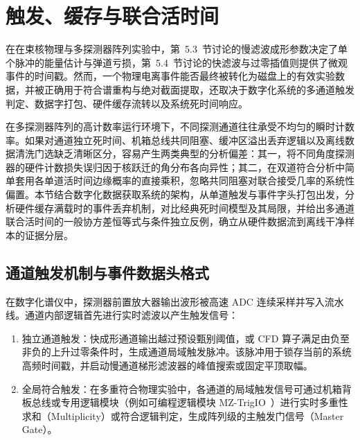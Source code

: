 \section{触发、缓存与联合活时间}\label{sec:5-5}

在在束核物理与多探测器阵列实验中，第~5.3~节讨论的慢滤波成形参数决定了单个脉冲的能量估计与弹道亏损，第~5.4~节讨论的快滤波与过零插值则提供了微观事件的时间戳。然而，一个物理电离事件能否最终被转化为磁盘上的有效实验数据，并被正确用于符合谱重构与绝对截面提取，还取决于数字化系统的多通道触发判定、数据字打包、硬件缓存流转以及系统死时间响应。

在多探测器阵列的高计数率运行环境下，不同探测通道往往承受不均匀的瞬时计数率。如果对通道独立死时间、机箱总线共同阻塞、缓冲区溢出丢弃逻辑以及离线数据清洗门选缺乏清晰区分，容易产生两类典型的分析偏差：其一，将不同角度探测器的硬件计数损失误归因于核跃迁的角分布各向异性；其二，在双道符合分析中简单套用各单道活时间边缘概率的直接乘积，忽略共同阻塞对联合接受几率的系统性偏置。本节结合数字化数据获取系统的架构，从单道触发与事件字头打包出发，分析硬件缓存满载时的事件丢弃机制，对比经典死时间模型及其局限，并给出多通道联合活时间的一般协方差恒等式与条件独立反例，确立从硬件数据流到离线干净样本的证据分层。

\subsection{通道触发机制与事件数据头格式}\label{subsec:5-5-1}

在数字化谱仪中，探测器前置放大器输出波形被高速 ADC 连续采样并写入流水线。通道内部逻辑首先进行实时滤波以产生触发信号：
\begin{enumerate}
\item 独立通道触发：快成形通道输出越过预设甄别阈值，或 CFD 算子满足由负至非负的上升过零条件时，生成通道局域触发脉冲。该脉冲用于锁存当前的系统高频时间戳，并启动慢通道梯形滤波器的峰值搜索或固定平顶取幅。
\item 全局符合触发：在多重符合物理实验中，各通道的局域触发信号可通过机箱背板总线或专用逻辑模块（例如可编程逻辑模块 MZ-TrigIO~\cite{wu-hongyi-2020-general-purpose-digital-daq-thesis}）进行实时多重性求和（Multiplicity）或符合逻辑判定，生成阵列级的主触发门信号（Master Gate）。
\end{enumerate}


